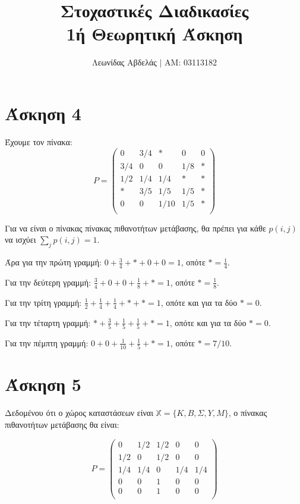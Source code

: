 \documentclass[11pt,a4paper]{article}
\title{Στοχαστικές Διαδικασίες \\
    1ή Θεωρητική Άσκηση}
\begin{document}
\date{}
\author{Λεωνίδας Αβδελάς $|$ ΑΜ: 03113182}

\maketitle

\section*{Άσκηση 4}

Έχουμε τον πίνακα:
\begin{equation*}
    P = 
    \begin{pmatrix}
        0   & 3/4 & *    & 0   & 0 \\
        3/4 & 0   & 0    & 1/8 & * \\
        1/2 & 1/4 & 1/4  & *   & * \\
        *   & 3/5 & 1/5  & 1/5 & * \\
        0   & 0   & 1/10 & 1/5 & * \\
    \end{pmatrix}
\end{equation*}

Για να είναι ο πίνακας πίνακας πιθανοτήτων μετάβασης, θα πρέπει για κάθε $p(i,j)$ να ισχύει $\sum_{j}{p(i,j)} = 1$.

Άρα για την πρώτη γραμμή: $0 + \frac{3}{4} + * + 0 + 0 = 1$, οπότε $* = \frac{1}{4}$.

Για την δεύτερη γραμμή: $\frac{3}{4} + 0 + 0 + \frac{1}{8} + * = 1$, οπότε $* = \frac{1}{8}$.

Για την τρίτη γραμμή: $\frac{1}{2} + \frac{1}{4} + \frac{1}{4} + * + * = 1$, οπότε και για τα δύο $* = 0$.

Για την τέταρτη γραμμή: $* + \frac{3}{5} + \frac{1}{5} + \frac{1}{5} + * = 1$, οπότε και για τα δύο $* = 0$.

Για την πέμπτη γραμμή: $0 + 0 + \frac{1}{10} + \frac{1}{5} + * = 1$, οπότε $* = 7/10$.

\section*{Άσκηση 5}

Δεδομένου ότι ο χώρος καταστάσεων είναι $\mathbb{X} = \{K, B, Σ, Y, M\}$, ο πίνακας πιθανοτήτων μετάβασης θα είναι:

\begin{equation*}
    P = 
    \begin{pmatrix}
        0   & 1/2 & 1/2 & 0   & 0   \\
        1/2 & 0   & 1/2 & 0   & 0   \\
        1/4 & 1/4 & 0   & 1/4 & 1/4 \\
        0   & 0   & 1   & 0   & 0   \\
        0   & 0   & 1   & 0   & 0   \\
    \end{pmatrix}
\end{equation*}
\end{document}
